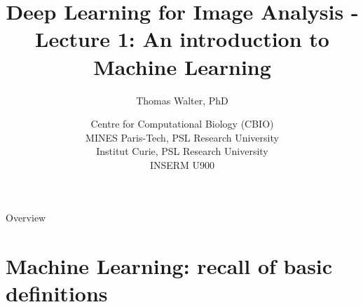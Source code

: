 \documentclass[xcolor=pdftex,dvipsnames,table]{beamer}
\title{Deep Learning for Image Analysis - \\
	   Lecture 1: An introduction to Machine Learning}
\author{Thomas Walter, PhD}
\date{Centre for Computational Biology (CBIO) \\
	  MINES Paris-Tech, PSL Research University \\
	  Institut Curie, PSL Research University \\
	  INSERM U900}
\begin{document}
\begin{frame}
\titlepage
\end{frame}

\begin{frame}{Overview}
\tableofcontents
\end{frame}

\section{Machine Learning: recall of basic definitions}

\end{document}
